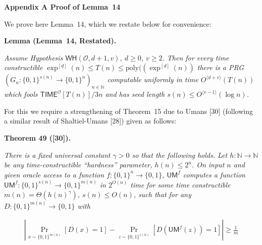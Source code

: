 \par\medskip\noindent\textbf{
Appendix A Proof of Lemma 14
}\par




We prove here Lemma 14, which we restate below for convenience:\par





\par\medskip\noindent\textbf{
\textbf{Lemma}\textbf{ }(Lemma 14, Restated)\textbf{.}
}\par



\emph{Assume Hypothesis $\mathsf{WH}(\mathcal{O},d+1,v)$, $d\geq 0$, $v\geq 2$. Then for every time constructible $\exp^{[d]}(n)\leq T(n)\leq\mathrm{poly}((\exp^{[d]}(n))$ there is a PRG $(G_{n}:\{0,1\}^{s(n)}\to\{0,1\}^{n})_{n\in\mathbb{N}}$ computable uniformly in time $O^{\langle d+v\rangle}(T(n))$ which fools ${\mathsf{TIME}}^{\mathcal{O}}[T(n)]/3n$ and has seed length $s(n)\leq O^{\langle v-1\rangle}(\log n)$.}\par






For this we require a strengthening of Theorem 15 due to Umans [30] (following a similar result of Shaltiel-Umans [28]) given as follows:\par





\par\medskip\noindent\textbf{
\textbf{Theorem 49}\textbf{ }([30])\textbf{.}
}\par



\emph{There is a fixed universal constant $\gamma>0$ so that the following holds. Let $h:\mathbb{N}\to\mathbb{N}$ be any time-constructible “hardness” parameter, $h(n)\leq 2^{n}$. On input $n$ and given oracle access to a function $f:\{0,1\}^{n}\to\{0,1\}$, $\mathsf{UM}^{f}$ computes a function $\mathsf{UM}^{f}:\{0,1\}^{s(n)}\to\{0,1\}^{m(n)}$ in $2^{O(n)}$ time for some time constructible $m(n)=\Theta(h(n)^{\gamma})$, $s(n)\leq O(n)$, such that for any $D:\{0,1\}^{m(n)}\to\{0,1\}$ with}\par


\[\begin{gathered}
|\Pr_{x\sim\{0,1\}^{m(n)}}[D(x)=1]-\Pr_{z\sim\{0,1\}^{s(n)}}[D(\mathsf{UM}^{f}(z))=1]|\geq\frac{1}{m}
\end{gathered}\]


